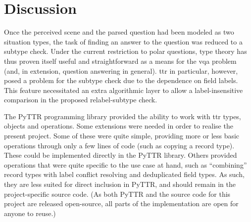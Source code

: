 \renewcommand{\sectionautorefname}{Section}
\let\subsectionautorefname\sectionautorefname
\let\subsubsectionautorefname\sectionautorefname
\section{Discussion}
\label{sec:discussion}


Once the perceived scene and the parsed question had been modeled as two situation types, the task of finding an answer to the question was reduced to a subtype check.
Under the current restriction to polar questions, type theory has thus proven itself useful and straightforward as a means for the \gls{vqa} problem (and, in extension, question answering in general).
\gls{ttr} in particular, however, posed a problem for the subtype check due to the dependence on field labels.
This feature necessitated an extra algorithmic layer to allow a label-insensitive comparison in the proposed relabel-subtype check.

The PyTTR programming library provided the ability to work with \gls{ttr} types, objects and operations.
Some extensions were needed in order to realise the present project.
Some of these were quite simple, providing more or less basic operations through only a few lines of code (such as copying a record type).
These could be implemented directly in the PyTTR library.
Others provided operations that were quite specific to the use case at hand, such as ``combining'' record types with label conflict resolving and deduplicated field types.
As such, they are less suited for direct inclusion in PyTTR, and should remain in the project-specific source code.
(As both PyTTR and the source code for this project are released open-source, all parts of the implementation are open for anyone to reuse.)
